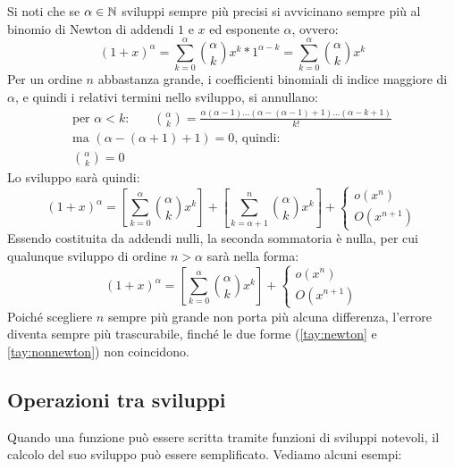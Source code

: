 \begin{itemize}
	      Si noti che se $\alpha\in\mathbb{N}$ sviluppi sempre più precisi si avvicinano sempre più al binomio di Newton di addendi $1$ e $x$ ed esponente $\alpha$, ovvero:
	      \begin{equation}
		      \label{tay:newton}
		      (1+x)^\alpha=\sum_{k=0}^\alpha\binom{\alpha}{k}x^k*1^{\alpha-k}=\sum_{k=0}^\alpha\binom{\alpha}{k}x^k
	      \end{equation}
	      Per un ordine $n$ abbastanza grande, i coefficienti binomiali di indice maggiore di $\alpha$, e quindi i relativi termini nello sviluppo, si annullano:
	      \begin{gather*}
		      \text{per $\alpha<k$:}\qquad\binom{\alpha}{k}=\frac{\alpha(\alpha-1)\dots(\alpha-(\alpha-1)+1)\dots(\alpha-k+1)}{k!}\\
		      \text{ma }(\alpha-(\alpha+1)+1)=0\text{, quindi:}\\
		      \binom{\alpha}{k}=0
	      \end{gather*}
	      Lo sviluppo sarà quindi:
	      \[
		      (1+x)^\alpha=\left[\sum_{k=0}^\alpha \binom{\alpha}{k}x^k\right]+\left[\sum_{k=\alpha+1}^n \binom{\alpha}{k}x^k\right]+\begin{cases}o(x^n)\\O(x^{n+1})\end{cases}
	      \]
	      Essendo costituita da addendi nulli, la seconda sommatoria è nulla, per cui qualunque sviluppo di ordine $n>\alpha$ sarà nella forma:
	      \begin{equation}
		      \label{tay:nonnewton}
		      (1+x)^\alpha=\left[\sum_{k=0}^\alpha \binom{\alpha}{k}x^k\right]+\begin{cases}o(x^n)\\O(x^{n+1})\end{cases}
	      \end{equation}
	      Poiché scegliere $n$ sempre più grande non porta più alcuna differenza, l'errore diventa sempre più trascurabile, finché le due forme (\ref{tay:newton} e \ref{tay:nonnewton}) non coincidono.
\end{itemize}


\subsection{Operazioni tra sviluppi}
Quando una funzione può essere scritta tramite funzioni di sviluppi notevoli, il calcolo del suo sviluppo può essere semplificato. Vediamo alcuni esempi:

